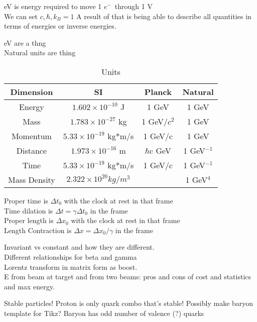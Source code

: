 \documentclass{article}
\date{Winter Semester 2022}
\author{\EC}
\def\elec{$e^{-}$\ }
\begin{document}
\maketitle

\begin{lecture}
    eV is energy required to move 1 \elec through 1 V \\
    We can set $c,\hbar,k_B=1$ A result of that is being able to describe all quantities in terms of energies or inverse energies. 
\end{lecture}
\begin{lecture}
    eV are a thng\\
    Natural units are thing
    \begin{table}[H]
        \centering
        \begin{tabular}{|c|c|c|c|}
            \hline
            Dimension & SI & Planck & Natural 
            \\\hline
            Energy & $1.602\times10^{-10}$ J & 1 GeV & 1 GeV \\\hline
            Mass & $1.783\times10^{-27}$ kg & 1 GeV/$c^2$ & 1 GeV\\\hline
            Momentum & $5.33\times10^{-19}$ kg*m/s & 1 GeV/c & 1 GeV\\\hline
            Distance & $1.973\times10^{-16}$ m & $\hbar$c GeV & 1 GeV$^{-1}$\\\hline
            Time & $5.33\times10^{-19}$ kg*m/s & 1 GeV/c & 1 GeV$^{-1}$\\\hline
            Mass Density & $2.322\times10^{20} kg/m^{3}$ & & 1 GeV$^4$
            \\\hline
        \end{tabular}
        \caption{Units}
        \label{tab:units}
    \end{table}
    \noindent Proper time is $\Delta t_0$ with the clock at rest in that frame
    \\
    Time dilation is $\Delta t =\gamma\Delta t_0$ in the frame
    \\
    Proper length is $\Delta x_0$ with the clock at rest in that frame
    \\
    Length Contraction is $\Delta x =\Delta x_0/\gamma$ in the frame
\end{lecture}
\begin{lecture}
    Invariant vs constant and how they are different. 
    \\
    Different relationships for beta and gamma
    \\
    Lorentz transform in matrix form as boost.
    \\
    E from beam at target and from two beams: pros and cons of cost and statistics and max energy. 
\end{lecture}
\begin{lecture}
    Stable particles! Proton is only quark combo that's stable! 
    Possibly make baryon template for Tikz? Baryon has odd number of valence (?) quarks
\end{lecture}
\end{document}
